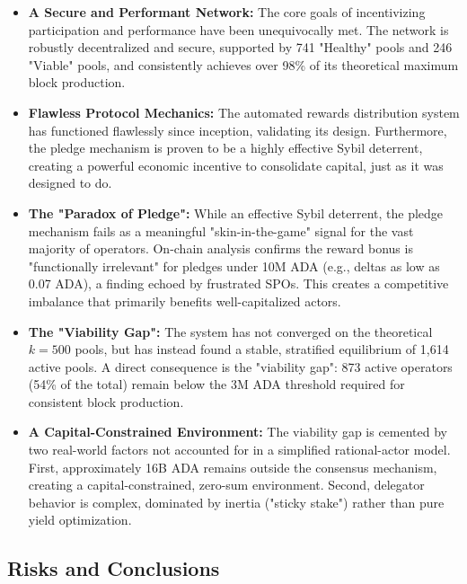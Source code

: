 \documentclass[11pt, letterpaper]{article}
\begin{document}
\begin{itemize}
    \item \textbf{A Secure and Performant Network:} The core goals of incentivizing participation and 
    performance have been unequivocally met. The network is robustly decentralized and secure, supported by 741 
    "Healthy" pools and 246 "Viable" pools, and consistently achieves over 98\% of its theoretical maximum block 
    production.
    
    \item \textbf{Flawless Protocol Mechanics:} The automated rewards distribution system has functioned 
    flawlessly since inception, validating its design. Furthermore, the pledge mechanism is proven to be a 
    highly effective Sybil deterrent, creating a powerful economic incentive to consolidate capital, just as it 
    was designed to do.
    
    \item \textbf{The "Paradox of Pledge":} While an effective Sybil deterrent, the pledge mechanism 
    fails as a meaningful "skin-in-the-game" signal for the vast majority of operators. On-chain analysis 
    confirms the reward bonus is "functionally irrelevant" for pledges under 10M ADA (e.g., deltas as low 
    as 0.07 ADA), a finding echoed by frustrated SPOs. This creates a competitive imbalance that primarily 
    benefits well-capitalized actors.
    
    \item \textbf{The "Viability Gap":} The system has not converged on the theoretical $k=500$ pools, but 
    has instead found a stable, stratified equilibrium of 1,614 active pools. A direct consequence is the 
    "viability gap": 873 active operators (54\% of the total) remain below the 3M ADA threshold required for 
    consistent block production.
    
    \item \textbf{A Capital-Constrained Environment:} The viability gap is cemented by two real-world factors 
    not accounted for in a simplified rational-actor model. First, approximately 16B ADA remains outside the 
    consensus mechanism, creating a capital-constrained, zero-sum environment. Second, delegator behavior is 
    complex, dominated by inertia ("sticky stake") rather than pure yield optimization.
\end{itemize}

\subsection*{Risks and Conclusions}
\end{document}
